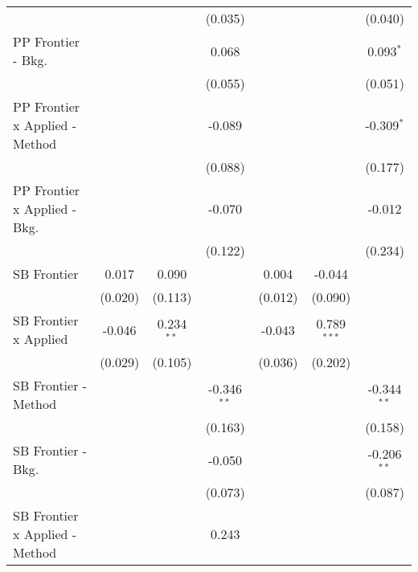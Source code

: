 \begin{tabular}{lcccccc}
                                  &                &              & (0.035)       &                &               & (0.040)\\   
   PP Frontier - Bkg.             &                &              & 0.068         &                &               & 0.093$^{*}$\\   
                                  &                &              & (0.055)       &                &               & (0.051)\\   
   PP Frontier x Applied - Method &                &              & -0.089        &                &               & -0.309$^{*}$\\   
                                  &                &              & (0.088)       &                &               & (0.177)\\   
   PP Frontier x Applied - Bkg.   &                &              & -0.070        &                &               & -0.012\\   
                                  &                &              & (0.122)       &                &               & (0.234)\\   
   SB Frontier                    & 0.017          & 0.090        &               & 0.004          & -0.044        &   \\   
                                  & (0.020)        & (0.113)      &               & (0.012)        & (0.090)       &   \\   
   SB Frontier x Applied          & -0.046         & 0.234$^{**}$ &               & -0.043         & 0.789$^{***}$ &   \\   
                                  & (0.029)        & (0.105)      &               & (0.036)        & (0.202)       &   \\   
   SB Frontier - Method           &                &              & -0.346$^{**}$ &                &               & -0.344$^{**}$\\   
                                  &                &              & (0.163)       &                &               & (0.158)\\   
   SB Frontier - Bkg.             &                &              & -0.050        &                &               & -0.206$^{**}$\\   
                                  &                &              & (0.073)       &                &               & (0.087)\\   
   SB Frontier x Applied - Method &                &              & 0.243         &                &               &   \\   

\end{tabular}
